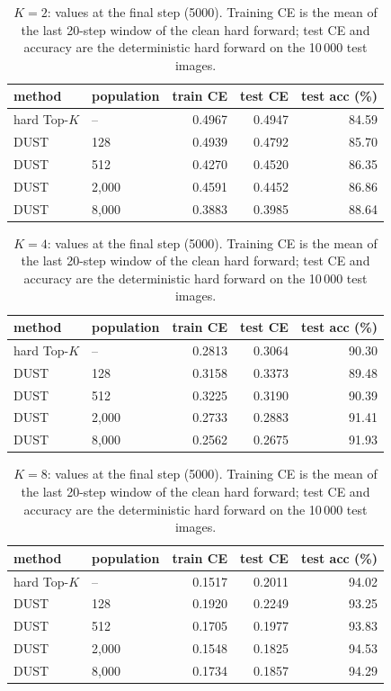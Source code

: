 \begin{table}[H]
\centering
\caption{$K = 2$: values at the final step (5000). Training CE is the mean of the last 20-step window of the clean hard forward; test CE and accuracy are the deterministic hard forward on the 10\,000 test images.}
\label{tab:k2}
\begin{tabular}{llrrr}
\toprule
    method & population & train CE & test CE & test acc (\%) \\
\midrule
    hard Top-$K$ & -- & 0.4967 & 0.4947 & 84.59 \\
    DUST & 128 & 0.4939 & 0.4792 & 85.70 \\
    DUST & 512 & 0.4270 & 0.4520 & 86.35 \\
    DUST & 2,000 & 0.4591 & 0.4452 & 86.86 \\
    DUST & 8,000 & 0.3883 & 0.3985 & 88.64 \\
\bottomrule
\end{tabular}
\end{table}

\begin{table}[H]
\centering
\caption{$K = 4$: values at the final step (5000). Training CE is the mean of the last 20-step window of the clean hard forward; test CE and accuracy are the deterministic hard forward on the 10\,000 test images.}
\label{tab:k4}
\begin{tabular}{llrrr}
\toprule
    method & population & train CE & test CE & test acc (\%) \\
\midrule
    hard Top-$K$ & -- & 0.2813 & 0.3064 & 90.30 \\
    DUST & 128 & 0.3158 & 0.3373 & 89.48 \\
    DUST & 512 & 0.3225 & 0.3190 & 90.39 \\
    DUST & 2,000 & 0.2733 & 0.2883 & 91.41 \\
    DUST & 8,000 & 0.2562 & 0.2675 & 91.93 \\
\bottomrule
\end{tabular}
\end{table}

\begin{table}[H]
\centering
\caption{$K = 8$: values at the final step (5000). Training CE is the mean of the last 20-step window of the clean hard forward; test CE and accuracy are the deterministic hard forward on the 10\,000 test images.}
\label{tab:k8}
\begin{tabular}{llrrr}
\toprule
    method & population & train CE & test CE & test acc (\%) \\
\midrule
    hard Top-$K$ & -- & 0.1517 & 0.2011 & 94.02 \\
    DUST & 128 & 0.1920 & 0.2249 & 93.25 \\
    DUST & 512 & 0.1705 & 0.1977 & 93.83 \\
    DUST & 2,000 & 0.1548 & 0.1825 & 94.53 \\
    DUST & 8,000 & 0.1734 & 0.1857 & 94.29 \\
\bottomrule
\end{tabular}
\end{table}

